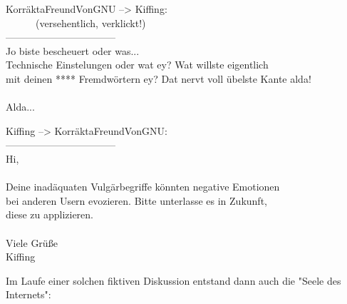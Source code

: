 \noindent \parbox{\textwidth}{

    \begin{footnotesize}
    \begin{itshape}

\noindent KorräktaFreundVonGNU --> Kiffing:\\
\noindent ~~~~~~(versehentlich, verklickt!)\\
\noindent ---------------------------------\\
\noindent Jo biste bescheuert oder was...\\
\noindent Technische Einstelungen oder wat ey? Wat willste eigentlich\\
\noindent mit deinen **** Fremdwörtern ey? Dat nervt voll übelste Kante alda!\\
\noindent ~\\
\noindent Alda... \\

    \end{itshape}
    \end{footnotesize}

}

\noindent \parbox{\textwidth}{

    \begin{footnotesize}
    \begin{itshape}
    \begin{flushright}

\noindent Kiffing --> KorräktaFreundVonGNU:\\
\noindent ---------------------------------\\
\noindent Hi,\\
\noindent ~\\
\noindent Deine inadäquaten Vulgärbegriffe könnten negative Emotionen\\
\noindent bei anderen Usern evozieren. Bitte unterlasse es in Zukunft,\\
\noindent diese zu applizieren.\\
\noindent ~\\
\noindent Viele Grüße\\
\noindent Kiffing\\

    \end{flushright}
    \end{itshape}
    \end{footnotesize}

}

Im Laufe einer solchen fiktiven Diskussion entstand dann auch die "Seele des Internets":

